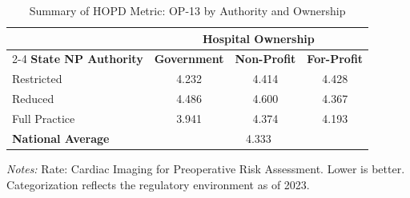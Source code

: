 \begin{table}[htbp]
    \centering
    \caption{Summary of HOPD Metric: OP-13 by Authority and Ownership}
    \label{tab:hopd_op_13_own}
    \vspace{0.2cm}
    \begin{tabular}{lccc}
        \toprule
        & \multicolumn{3}{c}{\textbf{Hospital Ownership}} \\
        \cmidrule(lr){2-4}
        \textbf{State NP Authority} & \textbf{Government} & \textbf{Non-Profit} & \textbf{For-Profit} \\
        \midrule
        Restricted & 4.232 & 4.414 & 4.428 \\
        Reduced & 4.486 & 4.600 & 4.367 \\
        Full Practice & 3.941 & 4.374 & 4.193 \\
        \midrule
        \textbf{National Average} & \multicolumn{3}{c}{4.333} \\
        \bottomrule
    \end{tabular}
    \vspace{0.1cm}
    \begin{minipage}{0.85\textwidth}
        \footnotesize \textit{Notes:} Rate: Cardiac Imaging for Preoperative Risk Assessment. Lower is better. Categorization reflects the regulatory environment as of 2023.
    \end{minipage}
\end{table}